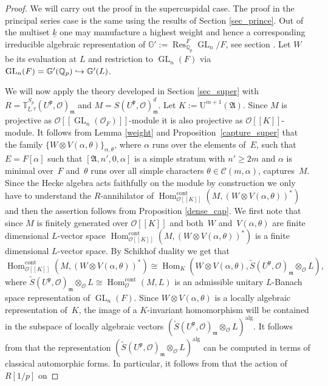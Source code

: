 \documentclass[11pt]{article}
\let\mathcal\mathscr
\newcommand\hto{\mathrel{\lhook\joinrel\to}}
\theoremstyle{definition}
\DeclareMathOperator{\Hom}{Hom}
\DeclareMathOperator{\Res}{Res}
\DeclareMathOperator{\GL}{GL}
\newcommand{\br}[1]{[\![#1]\!]}
\newcommand{\Qp}{\mathbb {Q}_p}
\newcommand{\Aa}{\mathfrak A}
\newcommand{\mm}{\mathfrak m}
\newcommand{\cO}{\mathcal{O}}
\newcommand{\TT}{\mathbb T}
\newcommand{\pp}{\mathfrak p}
\newcommand{\alg}{\mathrm{alg}}
\newcommand{\cont}{\mathrm{cont}}
\newcommand{\UU}{\mathrm U}
\begin{document}
\begin{proof} We will carry out the proof in the supercuspidal case. The proof in the principal series case is the same using the results of Section \ref{sec_prince}. Out of the multiset $\underline{k}$ one may manufacture a highest weight and hence a corresponding irreducible algebraic representation
of $\mathbb G':=\Res^F_{\Qp} \GL_n/F$, see section \cite[\S 1.8]{six-authors}. Let $W$ be its evaluation at $L$ and restriction to $\GL_n(F)$ via
$\GL_n(F)=\mathbb{G}'(\Qp)\hto \mathbb{G}'(L)$.

We will now apply the theory developed in Section \ref{sec_super} with
$R= \TT^{S_p}_{\xi, \tau}(U^{\pp}, \cO)_{\mm}$ and
$M= S(U^\pp, \cO)_{\mm}^d$. Let $K:=\UU^{m+1}(\Aa)$.
Since $M$ is projective as $\cO\br{\GL_n(\cO_F)}$-module
it is also projective as $\cO\br{K}$-module.
It follows from Lemma \ref{weight} and Proposition~\ref{capture_super} that the family $\{W\otimes V(\alpha, \theta)\}_{\alpha, \theta}$, where $\alpha$ runs over the elements of~$E$, such that
$E=F[\alpha]$ such that $[\Aa, n', 0, \alpha]$ is a simple stratum with $n'\ge 2m$ and $\alpha$ is minimal over~$F$ and~$\theta$ runs over all simple characters
$\theta\in \mathcal C(m, \alpha)$, captures~$M$.
Since the Hecke algebra acts faithfully on the module by construction
we only have to understand the
$R$-annihilator of $\Hom^{\cont}_{\cO\br{K}}(M, (W\otimes V(\alpha, \theta))^*)$ and then the assertion follows from Proposition \ref{dense_cap}. We first note that
since $M$ is finitely generated over $\cO\br{K}$ and both~$W$ and~$V(\alpha, \theta)$ are finite dimensional $L$-vector space \hbox{$\Hom^{\cont}_{\cO\br{K}}(M, (W\otimes V(\alpha, \theta))^*)$} is a finite dimensional $L$-vector space. By Schikhof
duality we get that
\[
\Hom^{\cont}_{\cO\br{K}}(M, (W\otimes V(\alpha, \theta))^*)\cong
\Hom_K(W\otimes V(\alpha, \theta), \tilde{S}(U^{\pp}, \cO)_{\mm}\otimes_{\cO} L),
\]
where $\tilde{S}(U^{\pp}, \cO)_{\mm}\otimes_{\cO} L\cong \Hom^{\cont}_{\cO} (M, L)$ is an admissible unitary $L$-Banach space representation of $\GL_n(F)$. Since
$W\otimes V(\alpha, \theta)$ is a locally algebraic representation of~$K$, the image of a $K$-invariant homomorphism will be contained in the subspace of locally algebraic vectors $(\tilde{S}(U^{\pp}, \cO)_{\mm}\otimes_{\cO} L)^\alg$. It follows from \cite[Prop.\,3.2.4]{em0} that the representation $(\tilde{S}(U^{\pp}, \cO)_{\mm}\otimes_{\cO} L)^\alg$ can be computed in terms of classical automorphic forms.
In particular, it follows from \cite[Prop.\,6.11]{gross} that the action of
$R[1/p]$ on

\end{proof}
\end{document}
